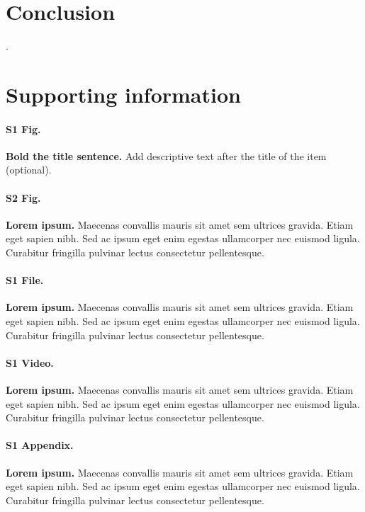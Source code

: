 \documentclass[10pt,letterpaper]{article}
\begin{document}
\section*{Conclusion}


 
 
 .

\section*{Supporting information}

\paragraph*{S1 Fig.}
\label{S1_Fig}
{\bf Bold the title sentence.} Add descriptive text after the title of the item (optional).

\paragraph*{S2 Fig.}
\label{S2_Fig}
{\bf Lorem ipsum.} Maecenas convallis mauris sit amet sem ultrices gravida. Etiam eget sapien nibh. Sed ac ipsum eget enim egestas ullamcorper nec euismod ligula. Curabitur fringilla pulvinar lectus consectetur pellentesque.

\paragraph*{S1 File.}
\label{S1_File}
{\bf Lorem ipsum.}  Maecenas convallis mauris sit amet sem ultrices gravida. Etiam eget sapien nibh. Sed ac ipsum eget enim egestas ullamcorper nec euismod ligula. Curabitur fringilla pulvinar lectus consectetur pellentesque.

\paragraph*{S1 Video.}
\label{S1_Video}
{\bf Lorem ipsum.}  Maecenas convallis mauris sit amet sem ultrices gravida. Etiam eget sapien nibh. Sed ac ipsum eget enim egestas ullamcorper nec euismod ligula. Curabitur fringilla pulvinar lectus consectetur pellentesque.

\paragraph*{S1 Appendix.}
\label{S1_Appendix}
{\bf Lorem ipsum.} Maecenas convallis mauris sit amet sem ultrices gravida. Etiam eget sapien nibh. Sed ac ipsum eget enim egestas ullamcorper nec euismod ligula. Curabitur fringilla pulvinar lectus consectetur pellentesque.
\end{document}

